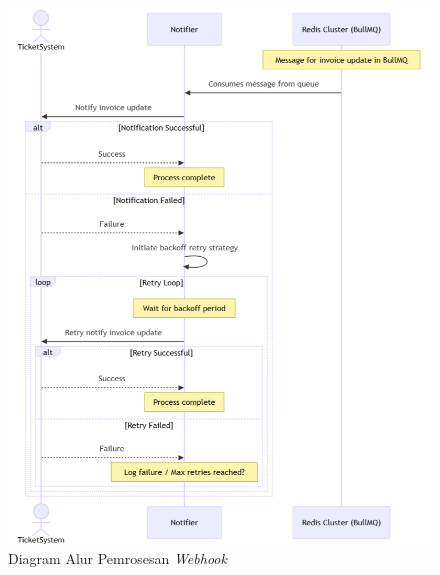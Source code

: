 \begin{figure}[htbp]
    \centering
    \includegraphics[width=1\textwidth]{resources/chapter-3/payment-flow2.png}
    \caption{Diagram Alur Pemrosesan \textit{Webhook}}
    \label{fig:payment-flow2}
\end{figure}